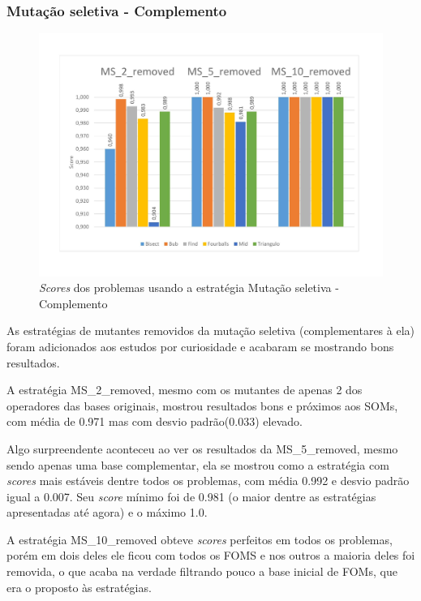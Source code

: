 \subsubsection{Mutação seletiva - Complemento}
\begin{figure}[H]
\includegraphics[width=1\textwidth]{graficos/strategies/mss_removed.jpg}
\caption{\textit{Scores} dos problemas usando a estratégia Mutação seletiva - Complemento}
\label{fig:selective-removed}
\end{figure}
As estratégias de mutantes removidos da mutação seletiva (complementares à ela) foram adicionados aos estudos por curiosidade e acabaram se mostrando bons resultados.

A estratégia MS\_2\_removed, mesmo com os mutantes de apenas 2 dos operadores das bases originais, mostrou resultados bons e próximos aos SOMs, com média de 0.971 mas com desvio padrão(0.033) elevado.

Algo surpreendente aconteceu ao ver os resultados da MS\_5\_removed, mesmo sendo apenas uma base complementar, ela se mostrou como a estratégia com \textit{scores} mais estáveis dentre todos os problemas, com média 0.992 e desvio padrão igual a 0.007. Seu \textit{score} mínimo foi de 0.981 (o maior dentre as estratégias apresentadas até agora) e o máximo 1.0. 

A estratégia MS\_10\_removed obteve \textit{scores} perfeitos em todos os problemas, porém em dois deles ele ficou com todos os FOMS e nos outros a maioria deles foi removida, o que acaba na verdade filtrando pouco a base inicial de FOMs, que era o proposto às estratégias.